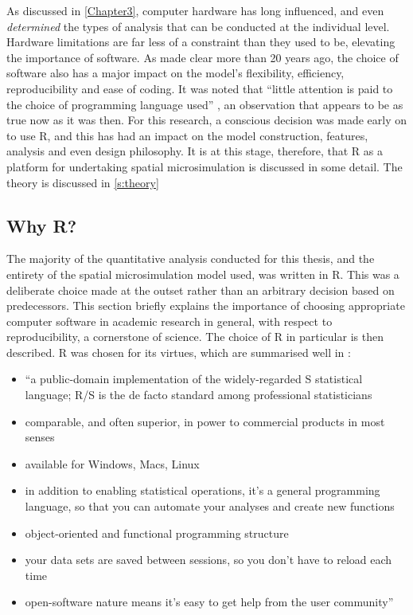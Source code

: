 \documentclass[a4paper, 11pt, twoside]{Thesis}
\begin{document}
As discussed in \cref{Chapter3}, computer hardware has long influenced, and even
\emph{determined} the types of analysis that can be conducted at the individual
level. Hardware limitations are far less of a constraint than they used to be,
elevating the importance of software. As \citet{Holm1987} made clear more than
20 years ago,
the choice of software also
has a major impact on the model's flexibility, efficiency, reproducibility and
ease of coding. It was noted that ``little attention is paid to the
choice of programming language used'' \citep[p.~153]{Holm1987}, an observation
that appears to be as true now as it was then. 
For this research, a conscious decision was made early on to use R, and this
has had an impact on the model construction, features, analysis and even design
philosophy. It is at this stage, therefore, that R as a platform for undertaking
spatial microsimulation is discussed in some detail. The theory is discussed in
\cref{s:theory}

\subsection{Why R?}
The majority of the quantitative analysis conducted for this thesis, and the
entirety of the spatial microsimulation model used, was written in R. This was
a deliberate choice made at the outset rather than an arbitrary decision based
on predecessors. This section briefly explains the importance of choosing
appropriate computer software in academic research in general, with respect to
reproducibility, a cornerstone of science. The choice of R in particular is then
described. R was chosen for its virtues, which are summarised well in
\citet{Matloff-R}:

\begin{itemize}
\item ``a public-domain implementation of the widely-regarded S statistical
language; R/S is the de facto standard among professional statisticians
\item comparable, and often superior, in power to commercial products in most
senses
\item available for Windows, Macs, Linux
\item in addition to enabling statistical operations, it's a general programming
language, so that you can
automate your analyses and create new functions
\item object-oriented and functional programming structure
\item your data sets are saved between sessions, so you don't have to reload
each time
\item open-software nature means it’s easy to get help from the user
community''
\end{itemize}
\end{document}
